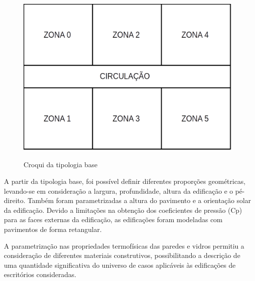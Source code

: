 \documentclass[brazil,hardcopy,openany,a5paper]{ufscthesis}
\begin{document}
		\begin{figure}[h]
			\centering
			\caption{Croqui da tipologia base}
			\includegraphics[width=1\linewidth]{img/croqui.png}
			\label{fig:croqui}
		\end{figure}
		
		
		A partir da tipologia base, foi possível definir diferentes proporções geométricas, levando-se em consideração a largura, profundidade, altura da edificação e o pé-direito. Também foram parametrizadas a altura do pavimento e a orientação solar da edificação.
		Devido a limitações na obtenção dos coeficientes de pressão (Cp) para as faces externas da edificação, as edificações foram modeladas com pavimentos de forma retangular.
		
		A parametrização nas propriedades termofísicas das paredes e vidros permitiu a consideração de diferentes materiais construtivos, possibilitando a descrição de uma quantidade significativa do universo de casos aplicáveis às edificações de escritórios consideradas. %
		
\end{document}
